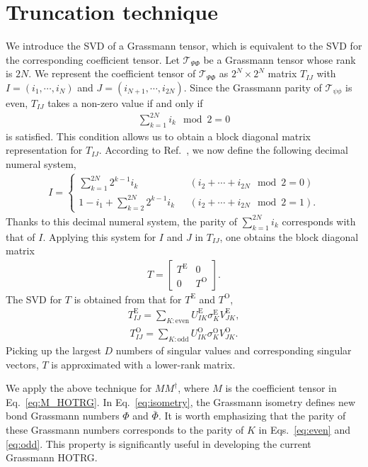 
\section{Truncation technique}
\label{sec:truncation}

We introduce the SVD of a Grassmann tensor, 
which is equivalent to the SVD for the corresponding coefficient tensor. 
Let $\mathcal{T}_{\Psi\Phi}$ be a Grassmann tensor whose rank is $2N$. 
We represent the coefficient tensor of $\mathcal{T}_{\Psi\Phi}$ as $2^{N}\times2^{N}$ 
matrix $T_{IJ}$ with $I=(i_{1},\cdots,i_{N})$ and $J=(i_{N+1},\cdots,i_{2N})$. 
Since the Grassmann parity of $\mathcal{T}_{\psi\phi}$ is even, $T_{IJ}$ takes a non-zero value if and only if
\begin{align}
	\sum_{k=1}^{2N}i_{k}\mod2=0
\end{align}
is satisfied. This condition allows us to obtain a block diagonal matrix representation for $T_{IJ}$. According to Ref.~\cite{Kadoh}, we now define the following decimal numeral system,
\begin{align}
	I=
	\begin{cases}
		\sum_{k=1}^{2N}2^{k-1}i_{k}~~~&(i_{2}+\cdots+i_{2N}\mod2=0) \\
		1-i_{1}+\sum_{k=2}^{2N}2^{k-1}i_{k}~~~&(i_{2}+\cdots+i_{2N}\mod2=1).
	\end{cases}
\end{align}
Thanks to this decimal numeral system, the parity of $\sum_{k=1}^{2N}i_{k}$ corresponds with that of $I$. Applying this system for $I$ and $J$ in $T_{IJ}$, one obtains the block diagonal matrix
\begin{align}
	T=
	\begin{bmatrix}
		T^{\mathrm{E}} & 0 \\
		0 & T^{\mathrm{O}}
	\end{bmatrix}
	.
\end{align} 
The SVD for $T$ is obtained from that for $T^{\mathrm{E}}$ and $T^{\mathrm{O}}$,
\begin{align}
\label{eq:even}
	T^{\mathrm{E}}_{IJ}=\sum_{K:\mathrm{even}}U^{\mathrm{E}}_{IK}\sigma^{\mathrm{E}}_{K}V^{\mathrm{E}}_{JK},
\end{align}
\begin{align}
\label{eq:odd}
	T^{\mathrm{O}}_{IJ}=\sum_{K:\mathrm{odd}}U^{\mathrm{O}}_{IK}\sigma^{\mathrm{O}}_{K}V^{\mathrm{O}}_{JK}.
\end{align}
Picking up the largest $D$ numbers of singular values and corresponding singular vectors, $T$ is approximated with a lower-rank matrix. 

We apply the above technique for $MM^{\dag}$, where $M$ is the coefficient tensor in Eq.~\eqref{eq:M_HOTRG}. In Eq.~\eqref{eq:isometry}, the Grassmann isometry defines new bond Grassmann numbers $\Phi$ and $\bar{\Phi}$. It is worth emphasizing that the parity of these Grassmann numbers corresponds to the parity of $K$ in Eqs.~\eqref{eq:even} and \eqref{eq:odd}. This property is significantly useful in developing the current Grassmann HOTRG.













